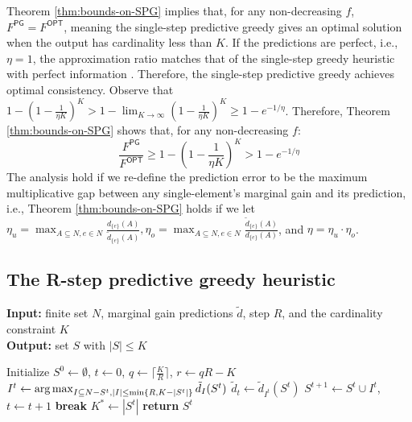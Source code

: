 Theorem \ref{thm:bounds-on-SPG} implies that, for any non-decreasing $f$, $F^{\textsf{PG}} = F^{\textsf{OPT}}$, meaning the single-step predictive greedy gives an optimal solution when the output has cardinality less than $K$. 
If the predictions are perfect, i.e., $\eta = 1$, the approximation ratio matches that of the single-step greedy heuristic with perfect information \cite{greedySubmodularFunctions}. Therefore, the single-step predictive greedy achieves optimal consistency. Observe that $1 - (1 - \frac{1}{\eta K})^K > 1 - \lim_{K \rightarrow \infty}{(1 - \frac{1}{\eta K})^K} \geq 1 - e^{-1/\eta}$. Therefore, Theorem \ref{thm:bounds-on-SPG} shows that, for any non-decreasing $f$: 
\[ \frac{F^{\textsf{PG}}}{F^{\textsf{OPT}}} \geq 1 - (1 - \frac{1}{\eta K})^K > 1 - e^{-1/\eta} \]
The analysis hold if we re-define the prediction error to be the maximum multiplicative gap between any single-element's marginal gain and its prediction, i.e., Theorem \ref{thm:bounds-on-SPG} holds if we let $\eta_u = \max_{A \subseteq N, e \in N}{\frac{d_{\{e\}}(A)}{\tilde{d}_{\{e\}}(A)}}, \eta_o = \max_{A \subseteq N, e \in N}{\frac{\tilde{d}_{\{ e \}}(A)}{d_{\{e\}}(A)}}$, and $\eta = \eta_u \cdot \eta_o$.

\subsection{The R-step predictive greedy heuristic}

\begin{algorithm}[tb]
\caption{R-step Predictive Greedy}
\label{alg:R-step-greedy}
\textbf{Input:} finite set \( N \), marginal gain predictions \( \tilde{d} \), step \( R \), and the cardinality constraint \( K \)\\
\textbf{Output:} set \( S \) with \( |S| \leq K \)
\begin{algorithmic}[1]  %
\State Initialize \( S^0 \gets \emptyset \), \( t \gets 0 \), \( q \gets \lceil \frac{K}{R} \rceil \), \( r \gets qR - K \)
    \State $I^t \gets \operatorname*{arg\,max}_{I \subseteq N - S^t, |I| \leq \min \{ R, K - |S^t| \}} {\tilde{d}_{I}(S^{t})}$
    \State \( \tilde{d}_t \gets \tilde{d}_{I^t}(S^t) \) %
        \State \( S^{t+1} \gets S^t \cup I^t \), \( t \gets t + 1 \) 
    \Else
        \State \textbf{break} 
    \EndIf
\EndWhile
\State \( K^* \gets |S^t| \) 
\State \textbf{return} \( S^t \)
\end{algorithmic}
\end{algorithm}

